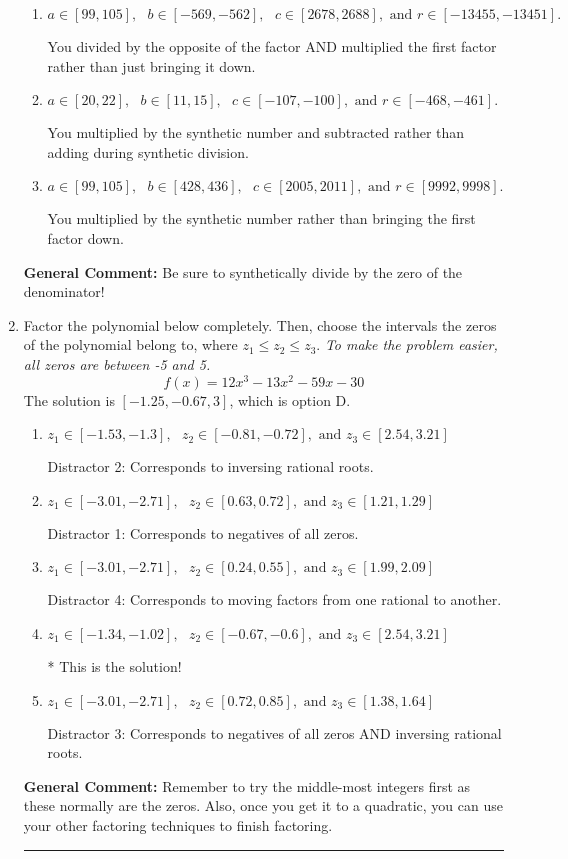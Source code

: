 \documentclass{extbook}[14pt]
\newcommand{\litem}[1]{\item #1

\rule{\textwidth}{0.4pt}}
\begin{document}
\begin{enumerate}
{\begin{enumerate}[label=\Alph*.]
 You divided by the opposite of the factor.
\item \( a \in [99, 105], \text{   } b \in [-569, -562], \text{   } c \in [2678, 2688], \text{   and   } r \in [-13455, -13451]. \)

 You divided by the opposite of the factor AND multiplied the first factor rather than just bringing it down.
\item \( a \in [20, 22], \text{   } b \in [11, 15], \text{   } c \in [-107, -100], \text{   and   } r \in [-468, -461]. \)

 You multiplied by the synthetic number and subtracted rather than adding during synthetic division.
\item \( a \in [99, 105], \text{   } b \in [428, 436], \text{   } c \in [2005, 2011], \text{   and   } r \in [9992, 9998]. \)

 You multiplied by the synthetic number rather than bringing the first factor down.
\end{enumerate}

\textbf{General Comment:} Be sure to synthetically divide by the zero of the denominator!
}
\litem{
Factor the polynomial below completely. Then, choose the intervals the zeros of the polynomial belong to, where $z_1 \leq z_2 \leq z_3$. \textit{To make the problem easier, all zeros are between -5 and 5.}
\[ f(x) = 12x^{3} -13 x^{2} -59 x -30 \]The solution is \( [-1.25, -0.67, 3] \), which is option D.\begin{enumerate}[label=\Alph*.]
\item \( z_1 \in [-1.53, -1.3], \text{   }  z_2 \in [-0.81, -0.72], \text{   and   } z_3 \in [2.54, 3.21] \)

 Distractor 2: Corresponds to inversing rational roots.
\item \( z_1 \in [-3.01, -2.71], \text{   }  z_2 \in [0.63, 0.72], \text{   and   } z_3 \in [1.21, 1.29] \)

 Distractor 1: Corresponds to negatives of all zeros.
\item \( z_1 \in [-3.01, -2.71], \text{   }  z_2 \in [0.24, 0.55], \text{   and   } z_3 \in [1.99, 2.09] \)

 Distractor 4: Corresponds to moving factors from one rational to another.
\item \( z_1 \in [-1.34, -1.02], \text{   }  z_2 \in [-0.67, -0.6], \text{   and   } z_3 \in [2.54, 3.21] \)

* This is the solution!
\item \( z_1 \in [-3.01, -2.71], \text{   }  z_2 \in [0.72, 0.85], \text{   and   } z_3 \in [1.38, 1.64] \)

 Distractor 3: Corresponds to negatives of all zeros AND inversing rational roots.
\end{enumerate}

\textbf{General Comment:} Remember to try the middle-most integers first as these normally are the zeros. Also, once you get it to a quadratic, you can use your other factoring techniques to finish factoring.
}
\end{enumerate}
\end{document}

